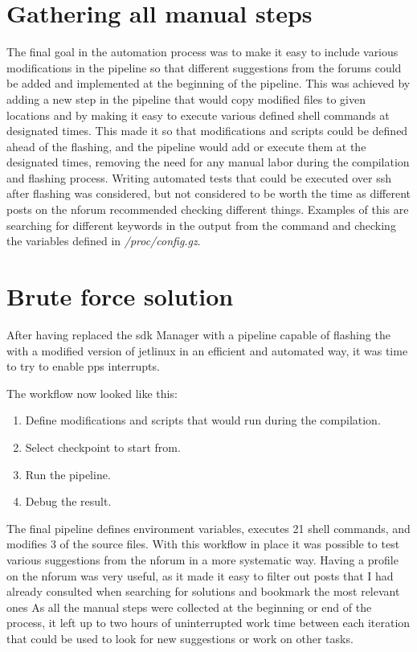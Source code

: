 \section{Gathering all manual steps}
The final goal in the automation process was to make it easy to include various modifications in the pipeline so that different suggestions from the forums could be added and implemented at the beginning of the pipeline.
This was achieved by adding a new step in the pipeline that would copy modified files to given locations and by making it easy to execute various defined shell commands at designated times.
This made it so that modifications and scripts could be defined ahead of the flashing, and the pipeline would add or execute them at the designated times, removing the need for any manual labor during the compilation and flashing process.
Writing automated tests that could be executed over \gls{ssh} after flashing was considered, but not considered to be worth the time as different posts on the \gls{nforum} recommended checking different things.
Examples of this are searching for different keywords in the output from the  command and checking the variables defined in \textit{/proc/config.gz}.

\section{Brute force solution}
After having replaced the \gls{sdk} Manager with a pipeline capable of flashing the \jx with a modified version of
\gls{jetlinux} in an efficient and automated way, it was time to try to enable \gls{pps} interrupts.

The workflow now looked like this:
\begin{enumerate}
    \item Define modifications and scripts that would run during the compilation.
    \item Select checkpoint to start from.
    \item Run the pipeline.
    \item Debug the result.
\end{enumerate}

The final pipeline defines environment variables, executes 21 shell commands, and modifies 3 of the source files.
With this workflow in place it was possible to test various suggestions from the \gls{nforum} in a more systematic way.
Having a profile on the \gls{nforum} was very useful, as it made it easy to filter out posts that I had already consulted when searching for solutions and bookmark the most relevant ones \cite{nvidiaNvidiaForumExtended2023}
As all the manual steps were collected at the beginning or end of the process, it left up to two hours of uninterrupted work time between each iteration that could be used to look for new suggestions or work on other tasks.

